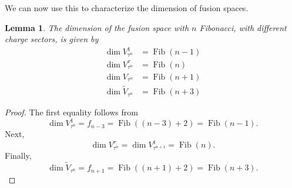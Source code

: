 \documentclass[a4paper,10pt,oneside]{book}
\theoremstyle{plain}
\newtheorem{lemma}[theorem]{Lemma}
\theoremstyle{definition}
\theoremstyle{remark}
\DeclareMathOperator{\Fib}{Fib}
\begin{document}
We can now use this to characterize the dimension of fusion spaces.

\begin{lemma}\label{lemma:fibonacci fusion space dimension}
  The dimension of the fusion space with $n$ Fibonacci, with different charge sectors, is given by
  \begin{equation}
    \begin{aligned}
      \dim V_{τ^n}^1 &= \Fib(n-1) \\
      \dim V_{τ^n}^τ &= \Fib(n) \\
      \dim V_{τ^n} &= \Fib(n+1) \\
      \dim \widetilde{V}_{τ^n} &= \Fib(n+3)
    \end{aligned}
  \end{equation}
\end{lemma}

\begin{proof}
  The first equality follows from
  \begin{equation}
    \dim V_{τ^n}^1 = f_{n-3} = \Fib((n-3)+2) = \Fib(n-1).
  \end{equation}
  Next,
  \begin{equation}
    \dim V_{τ^n}^τ = \dim V_{τ^{n+1}}^1 = \Fib(n).
  \end{equation}
  Finally,
  \begin{equation}
    \dim \widetilde{V}_{τ^n} = f_{n+1} = \Fib((n+1)+2) = \Fib(n+3).
  \end{equation}
\end{proof}
\end{document}

